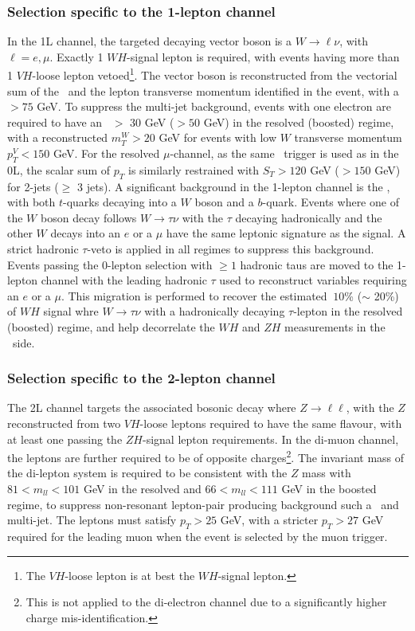 \subsubsection{Selection specific to the 1-lepton channel}
In the 1L channel, the targeted decaying vector boson is a $W \rightarrow \ell\nu$, with $\ell = e, \mu$. Exactly 1 $WH$-signal lepton is required, with events having more than 1 $VH$-loose lepton vetoed\footnote{The $VH$-loose lepton is at best the $WH$-signal lepton.}. The vector boson is reconstructed from the vectorial sum of the \etm\ and the lepton transverse momentum identified in the event, with a \ptv\ $> 75$ GeV. To suppress the multi-jet background, events with one electron are required to have an \etm\ $>$ 30 GeV ($> 50$ GeV) in the resolved (boosted) regime, with a reconstructed $m_T^W > 20$ GeV for events with low $W$ transverse momentum $p_T^V < 150$ GeV. For the resolved $\mu$-channel, as the same \etm\ trigger is used as in the 0L, the scalar sum of $p_T$ is similarly restrained with $S_T > 120$ GeV ($> 150$ GeV) for 2-jets ($\geq$ 3 jets). A significant background in the 1-lepton channel is the \ttb, with both $t$-quarks decaying into a $W$ boson and a $b$-quark. Events where one of the $W$ boson decay follows $W \rightarrow \tau \nu$ with the $\tau$ decaying hadronically and the other $W$ decays into an $e$ or a $\mu$ have the same leptonic signature as the signal. A strict hadronic $\tau$-veto is applied in all regimes to suppress this background. Events passing the 0-lepton selection with $\geq 1$ hadronic taus are moved to the 1-lepton channel with the leading hadronic $\tau$ used to reconstruct variables requiring an $e$ or a $\mu$. This migration is performed to recover the estimated $~10$\% ($\sim$ 20\%) of $WH$ signal whre $W\rightarrow \tau \nu$ with a hadronically decaying $\tau$-lepton in the resolved (boosted) regime, and help decorrelate the $WH$ and $ZH$ measurements in the \vhb\ side.

\subsubsection{Selection specific to the 2-lepton channel}
The 2L channel targets the associated bosonic decay where $Z \rightarrow\ell\ell$, with the $Z$ reconstructed from two $VH$-loose leptons required to have the same flavour, with at least one passing the $ZH$-signal lepton requirements. In the di-muon channel, the leptons are further required to be of opposite charges\footnote{This is not applied to the di-electron channel due to a significantly higher charge mis-identification.}. The invariant mass of the di-lepton system is required to be consistent with the $Z$ mass with $81 < m_{ll} < 101$ GeV in the resolved and $66 < m_{ll} < 111$ GeV in the boosted regime, to suppress non-resonant lepton-pair producing background such a \ttb\ and multi-jet. The leptons must satisfy $p_T > 25$ GeV, with a stricter $p_T > 27$ GeV required for the leading muon when the event is selected by the muon trigger.

